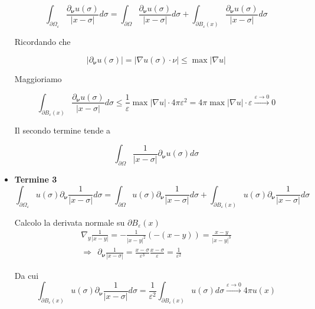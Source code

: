 \documentclass[10pt,a4paper,twoside,openright]{book}
\begin{document}
\begin{dimostrazione}
\begin{itemize}
		      \begin{equation*}
		      	\int _{\partial \Omega _{\varepsilon }}\frac{\partial _{\bm{\nu}} u(\sigma)}{| x-\sigma | } d\sigma =\int _{\partial \Omega }\frac{\partial _{\bm{\nu}} u(\sigma)}{| x-\sigma | } d\sigma +\int _{\partial B_{\varepsilon }(x)}\frac{\partial _{\bm{\nu}} u(\sigma)}{| x-\sigma | } d\sigma 
		      \end{equation*}
		      
		      Ricordando che 
		      
		      \begin{equation*}
		      	| \partial _{\bm{\nu}} u(\sigma)| =| \nabla u(\sigma) \cdotp \nu | \leqslant \max| \nabla u| 
		      \end{equation*}
		      
		      Maggioriamo
		      
		      \begin{equation*}
		      	\int _{\partial B_{\varepsilon }(x)}\frac{\partial _{\bm{\nu}} u(\sigma)}{| x-\sigma | } d\sigma \leqslant \frac{1}{\varepsilon }\max| \nabla u| \cdotp 4\pi \varepsilon ^{2} = 4\pi \max| \nabla u| \cdotp \varepsilon \xrightarrow{\varepsilon \rightarrow 0} 0
		      \end{equation*}
		      
		      Il secondo termine tende a
		      
		      \begin{equation*}
		      	\int _{\partial \Omega }\frac{1}{| x-\sigma | } \partial _{\bm{\nu}} u(\sigma) d\sigma 
		      \end{equation*}
		\item \textbf{Termine 3}\begin{equation*}
		      \int _{\partial \Omega _{\varepsilon }} u(\sigma) \partial _{\bm{\nu}}\frac{1}{| x-\sigma | } d\sigma =\int _{\partial \Omega } u(\sigma) \partial _{\bm{\nu}}\frac{1}{| x-\sigma | } d\sigma +\int _{\partial B_{\varepsilon }(x)} u(\sigma) \partial _{\bm{\nu}}\frac{1}{| x-\sigma | } d\sigma 
		\end{equation*}
		
		Calcolo la derivata normale su $\displaystyle \partial B_{\varepsilon }(x)$\begin{gather*}
		\nabla _{y}\frac{1}{| x-y| } =-\frac{1}{| x-y| ^{2}}(-(x-y)) =\frac{x-y}{| x-y| ^{3}}\\
		\Rightarrow \ \ \partial _{\bm{\nu}}\frac{1}{| x-\sigma | } =\frac{x-\sigma }{\varepsilon ^{3}}\frac{x-\sigma }{\varepsilon } =\frac{1}{\varepsilon ^{2}}
		\end{gather*}
		
		Da cui\begin{equation*}
		\int _{\partial B_{\varepsilon }(x)} u(\sigma) \partial _{\bm{\nu}}\frac{1}{| x-\sigma | } d\sigma =\frac{1}{\varepsilon ^{2}}\int _{\partial B_{\varepsilon }(x)} u(\sigma) d\sigma \xrightarrow{\varepsilon \rightarrow 0} 4\pi u(x)
		\end{equation*}
	\end{itemize}
\end{dimostrazione}
\end{document}
